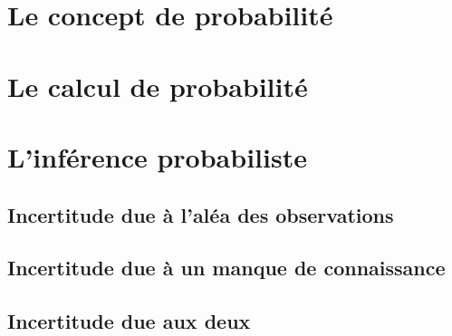 \documentclass{beamer}
\begin{document}


\section{Le concept de probabilité}

\section{Le calcul de probabilité}

\section{L'inférence probabiliste}

\subsection{Incertitude due à l'aléa des observations}%

\subsection{Incertitude due à un manque de connaissance}%

\subsection{Incertitude due aux deux}





\end{document}
